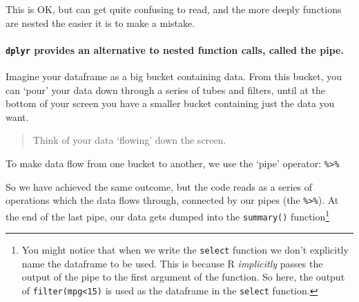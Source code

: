 \documentclass[]{article}
\newenvironment{Shaded}{\begin{snugshade}}{\end{snugshade}}
\newcommand{\KeywordTok}[1]{\textcolor[rgb]{0.13,0.29,0.53}{\textbf{#1}}}
\newcommand{\DecValTok}[1]{\textcolor[rgb]{0.00,0.00,0.81}{#1}}
\newcommand{\StringTok}[1]{\textcolor[rgb]{0.31,0.60,0.02}{#1}}
\newcommand{\CommentTok}[1]{\textcolor[rgb]{0.56,0.35,0.01}{\textit{#1}}}
\newcommand{\OperatorTok}[1]{\textcolor[rgb]{0.81,0.36,0.00}{\textbf{#1}}}
\newcommand{\NormalTok}[1]{#1}
\let\oldparagraph\paragraph
\renewcommand{\paragraph}[1]{\oldparagraph{#1}\mbox{}}
\let\rmarkdownfootnote\footnote%
\def\footnote{\protect\rmarkdownfootnote}
\theoremstyle{definition}
\theoremstyle{definition}
\theoremstyle{definition}
\theoremstyle{remark}
\begin{document}
This is OK, but can get quite confusing to read, and the more deeply
functions are nested the easier it is to make a mistake.

\paragraph{\texorpdfstring{\texttt{dplyr} provides an alternative to
nested function calls, called the
pipe.}{dplyr provides an alternative to nested function calls, called the pipe.}}\label{dplyr-provides-an-alternative-to-nested-function-calls-called-the-pipe.}

Imagine your dataframe as a big bucket containing data. From this
bucket, you can `pour' your data down through a series of tubes and
filters, until at the bottom of your screen you have a smaller bucket
containing just the data you want.

\begin{quote}
Think of your data `flowing' down the screen.
\end{quote}

To make data flow from one bucket to another, we use the `pipe'
operator: \texttt{\%\textgreater{}\%}

\begin{Shaded}
\end{Shaded}

So we have achieved the same outcome, but the code reads as a series of
operations which the data flows through, connected by our pipes (the
\texttt{\%\textgreater{}\%}). At the end of the last pipe, our data gets
dumped into the \texttt{summary()} function\footnote{You might notice
  that when we write the \texttt{select} function we don't explicitly
  name the dataframe to be used. This is because R \emph{implicitly}
  passes the output of the pipe to the first argument of the function.
  So here, the output of \texttt{filter(mpg\textless{}15)} is used as
  the dataframe in the \texttt{select} function.}
\end{document}
